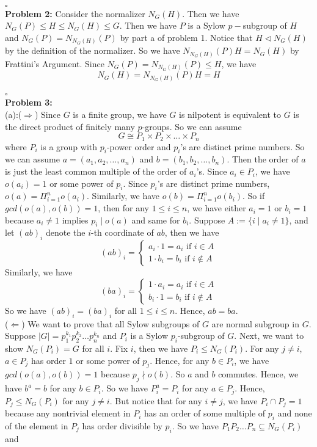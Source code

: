 \documentclass[12pt]{amsart}
\newcommand{\normal}{\triangleleft}
\begin{document}
\\\phantom{qed}\hfill$\square$\\
\textbf{Problem 2:} Consider the normalizer $N_G(H)$. Then we have $N_G(P)\leq H\leq N_G(H)\leq G$. Then we have $P$ is a Sylow $p-$subgroup of $H$ and $N_G(P)=N_{N_G(H)}(P)$ by part a of problem 1. Notice that $H\normal N_G(H)$ by the definition of the normalizer. So we have $N_{N_G(H)}(P)H=N_G(H)$ by Frattini's Argument. Since $N_G(P)=N_{N_G(H)}(P)\leq H$, we have 
\[N_G(H)=N_{N_G(H)}(P)H=H\]
\\\phantom{qed}\hfill$\square$\\
\textbf{Problem 3:}\\
(a):($\Rightarrow$) Since $G$ is a finite group, we have $G$ is nilpotent is equivalent to $G$ is the direct product of finitely many $p$-groups. So we can assume 
\[G\cong P_1\times P_2\times \dots\times P_n\]
where $P_i$ is a group with $p_i$-power order and $p_i$'s are distinct prime numbers. So we can assume $a=(a_1,a_2,\dots,a_n)$ and $b=(b_1,b_2,\dots,b_n)$. Then the order of $a$ is just the least common multiple of the order of $a_i$'s. Since $a_i\in P_i$, we have $o(a_i)=1$ or some power of $p_i$. Since $p_i$'s are distinct prime numbers, $o(a)=\Pi_{i=1}^n o(a_i)$. Similarly, we have $o(b)=\Pi_{i=1}^n o(b_i)$. So if $gcd(o(a),o(b))=1$, then for any $1\leq i\leq n$, we have either $a_i=1$ or $b_i=1$ because $a_i\neq 1$ implies $p_i\mid o(a)$ and same for $b_i$. Suppose $A:=\{i\mid a_i\neq 1\}$, and let $(ab)_i$ denote the $i$-th coordinate of $ab$, then we have 
\[(ab)_i=\begin{cases}
    a_i\cdot 1=a_i \text{ if } i\in A\\
    1\cdot b_i=b_i \text{ if } i\notin A
\end{cases}\]
Similarly, we have 
\[(ba)_i=\begin{cases}
    1\cdot a_i=a_i \text{ if } i\in A\\
    b_i\cdot 1=b_i \text{ if } i\notin A
\end{cases}\]
So we have $(ab)_i=(ba)_i$ for all $1\leq i\leq n$. Hence, $ab=ba$.\\
($\Leftarrow$) We want to prove that all Sylow subgroups of $G$ are normal subgroup in $G$. Suppose $|G|=p_1^{k_1}p_2^{k_2}\dots p_n^{k_n}$ and $P_i$ is a Sylow $p_i$-subgroup of $G$. Next, we want to show $N_G(P_i)=G$ for all $i$. Fix $i$, then we have $P_i\leq N_G(P_i)$. For any $j\neq i$, $a\in P_j$ has order $1$ or some power of $p_j$. Hence, for any $b\in P_i$, we have $gcd(o(a),o(b))=1$ because $p_j\nmid o(b)$. So $a$ and $b$ commutes. Hence, we have $b^a=b$ for any $b\in P_i$. So we have $P_i^a=P_i$ for any $a\in P_j$. Hence, $P_j\leq N_G(P_i)$ for any $j\neq i$. But notice that for any $i\neq j$, we have $P_i\cap P_j=1$ because any nontrivial element in $P_i$ has an order of some multiple of $p_i$ and none of the element in $P_j$ has order divisible by $p_i$. So we have $P_1P_2\dots P_n\subseteq N_G(P_i)$ and 
\end{document}
